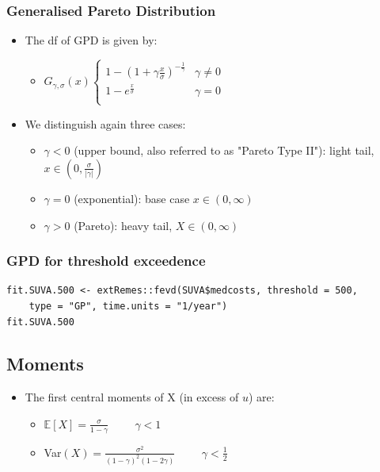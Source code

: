 \documentclass{article}
\begin{document}
\subsubsection{Generalised Pareto Distribution}

\begin{itemize}
    \item The df of GPD is given by:
    \begin{itemize}
        \item $G_{\gamma,\sigma}(x) \begin{cases}
            1 - (1+\gamma\frac{x}{\sigma})^{-\frac{1}{\gamma}} & \gamma \neq 0\\
            1 - e^{\frac{x}{\sigma}} & \gamma=0\\
        \end{cases}$
    \end{itemize}
    \item We distinguish again three cases:
    \begin{itemize}
        \item $\gamma < 0$ (upper bound, also referred to as "Pareto Type II"): light tail, $x \in (0,\frac{\sigma}{|\gamma|})$
        \item $\gamma = 0$ (exponential): base case $x\in (0,\infty)$
        \item $\gamma > 0$ (Pareto): heavy tail, $X \in (0,\infty)$
    \end{itemize}
\end{itemize}

\subsubsection{GPD for threshold exceedence}

\begin{lstlisting}
fit.SUVA.500 <- extRemes::fevd(SUVA$medcosts, threshold = 500, 
    type = "GP", time.units = "1/year")
fit.SUVA.500
\end{lstlisting}


\subsection{Moments}

\begin{itemize}
    \item The first central moments of X (in excess of $u$) are:
    \begin{itemize}
        \item $\mathbb{E}[X] = \frac{\sigma}{1 - \gamma} \hspace{1cm} \gamma < 1$
        \item Var$(X) = \frac{\sigma^2}{(1-\gamma)^2 (1-2\gamma)} \hspace{1cm} \gamma < \frac{1}{2}$ 
    \end{itemize}
\end{itemize}
\end{document}
